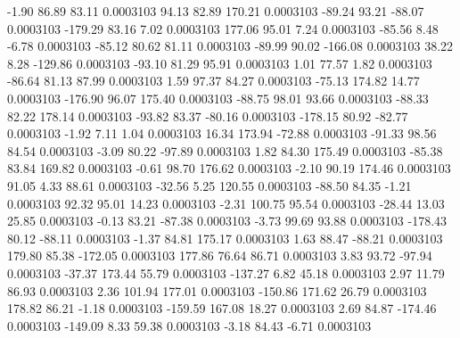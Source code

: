        -1.90       86.89       83.11     0.0003103
       94.13       82.89      170.21     0.0003103
      -89.24       93.21      -88.07     0.0003103
     -179.29       83.16        7.02     0.0003103
      177.06       95.01        7.24     0.0003103
      -85.56        8.48       -6.78     0.0003103
      -85.12       80.62       81.11     0.0003103
      -89.99       90.02     -166.08     0.0003103
       38.22        8.28     -129.86     0.0003103
      -93.10       81.29       95.91     0.0003103
        1.01       77.57        1.82     0.0003103
      -86.64       81.13       87.99     0.0003103
        1.59       97.37       84.27     0.0003103
      -75.13      174.82       14.77     0.0003103
     -176.90       96.07      175.40     0.0003103
      -88.75       98.01       93.66     0.0003103
      -88.33       82.22      178.14     0.0003103
      -93.82       83.37      -80.16     0.0003103
     -178.15       80.92      -82.77     0.0003103
       -1.92        7.11        1.04     0.0003103
       16.34      173.94      -72.88     0.0003103
      -91.33       98.56       84.54     0.0003103
       -3.09       80.22      -97.89     0.0003103
        1.82       84.30      175.49     0.0003103
      -85.38       83.84      169.82     0.0003103
       -0.61       98.70      176.62     0.0003103
       -2.10       90.19      174.46     0.0003103
       91.05        4.33       88.61     0.0003103
      -32.56        5.25      120.55     0.0003103
      -88.50       84.35       -1.21     0.0003103
       92.32       95.01       14.23     0.0003103
       -2.31      100.75       95.54     0.0003103
      -28.44       13.03       25.85     0.0003103
       -0.13       83.21      -87.38     0.0003103
       -3.73       99.69       93.88     0.0003103
     -178.43       80.12      -88.11     0.0003103
       -1.37       84.81      175.17     0.0003103
        1.63       88.47      -88.21     0.0003103
      179.80       85.38     -172.05     0.0003103
      177.86       76.64       86.71     0.0003103
        3.83       93.72      -97.94     0.0003103
      -37.37      173.44       55.79     0.0003103
     -137.27        6.82       45.18     0.0003103
        2.97       11.79       86.93     0.0003103
        2.36      101.94      177.01     0.0003103
     -150.86      171.62       26.79     0.0003103
      178.82       86.21       -1.18     0.0003103
     -159.59      167.08       18.27     0.0003103
        2.69       84.87     -174.46     0.0003103
     -149.09        8.33       59.38     0.0003103
       -3.18       84.43       -6.71     0.0003103
